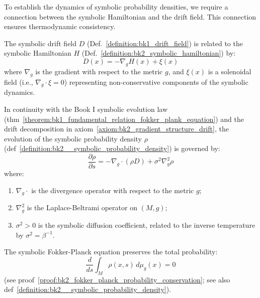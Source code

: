 To establish the dynamics of symbolic probability densities, we require a connection between the symbolic Hamiltonian and the drift field. This connection ensures thermodynamic consistency.

\begin{axiom}
\label{axiom:bk2_gradient_structure_drift}
The symbolic drift field $D$ (Def.~\ref{definition:bk1_drift_field}) is related to the symbolic Hamiltonian $H$ (Def.~\ref{definition:bk2_symbolic_hamiltonian}) by:
\[
D(x) = -\nabla_g H(x) + \xi(x)
\]
where $\nabla_g$ is the gradient with respect to the metric $g$, and $\xi(x)$ is a solenoidal field (i.e., $\nabla_g \cdot \xi = 0$) representing non-conservative components of the symbolic dynamics.
\end{axiom}

\begin{axiom}
\label{axiom:bk2_symbolic_fokker_planck_equation}
In continuity with the Book I symbolic evolution law (thm~\ref{theorem:bk1_fundamental_relation_fokker_plank_equation}) and the drift decomposition in axiom~\ref{axiom:bk2_gradient_structure_drift}, the evolution of the symbolic probability density $\rho$ (def~\ref{definition:bk2__symbolic_probability_density}) is governed by:
\[
\frac{\partial \rho}{\partial s} = -\nabla_g \cdot (\rho D) + \sigma^2 \nabla_g^2 \rho
\]
where:
\begin{enumerate}
    \item $\nabla_g \cdot$ is the divergence operator with respect to the metric $g$;
    \item $\nabla_g^2$ is the Laplace-Beltrami operator on $(M,g)$;
    \item $\sigma^2 > 0$ is the symbolic diffusion coefficient, related to the inverse temperature by $\sigma^2 = \beta^{-1}$.
\end{enumerate}
\end{axiom}

\begin{lemma} 
\label{lemma:bk2_conservation_of_probability} 
The symbolic Fokker-Planck equation preserves the total probability: 
\[
\frac{d}{ds}\int_M \rho(x,s) \, d\mu_g(x) = 0
\]
(see proof~\ref{proof:bk2_fokker_planck_probability_conservation}; see also def~\ref{definition:bk2__symbolic_probability_density}).
\end{lemma}

